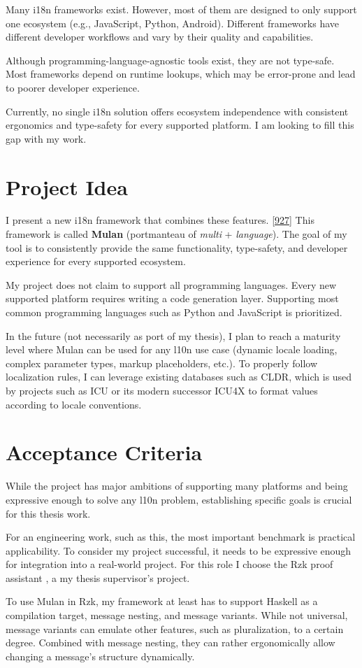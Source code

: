 Many i18n frameworks exist. However, most of them are designed
to only support one ecosystem (e.g., JavaScript, Python, Android).
Different frameworks have different developer workflows and vary
by their quality and capabilities.

Although programming-language-agnostic tools exist, they are not
type-safe. Most frameworks depend on runtime lookups, which may be
error-prone and lead to poorer developer experience.

Currently, no single i18n solution offers ecosystem independence
with consistent ergonomics and type-safety for every supported platform.
I am looking to fill this gap with my work.

\section{Project Idea}

I present a new i18n framework that combines these features.
{\hypersetup{urlcolor=black}\href{https://xkcd.com/927/}{[927]}} This
framework is called \textbf{Mulan} (portmanteau of \textit{multi} +
\textit{language}). The goal of my tool is to consistently provide
the same functionality, type-safety, and developer experience for every
supported ecosystem.

My project does not claim to support all programming languages. Every
new supported platform requires writing a code generation layer.
Supporting most common programming languages such as Python and
JavaScript is prioritized.

In the future (not necessarily as port of my thesis), I plan to reach
a maturity level where Mulan can be used for any l10n use case
(dynamic locale loading, complex parameter types, markup
placeholders, etc.). To properly follow localization rules, I can leverage
existing databases such as CLDR, \cite{cldr} which is used by
projects such as ICU \cite{icu} or its modern successor ICU4X
\cite{icu4x} to format values according to locale conventions.

\section{Acceptance Criteria}

While the project has major ambitions of supporting many platforms
and being expressive enough to solve any l10n problem, establishing
specific goals is crucial for this thesis work.

For an engineering work, such as this, the most important benchmark
is practical applicability. To consider my project successful, it
needs to be expressive enough for integration into a real-world
project. For this role I choose the Rzk proof assistant \cite{rzk},
a my thesis supervisor's project.

To use Mulan in Rzk, my framework at least has to support Haskell as a
compilation target, message nesting, and message variants. While not
universal, message variants can emulate other features, such as
pluralization, to a certain degree. Combined with message nesting,
they can rather ergonomically allow changing a message's structure dynamically.
